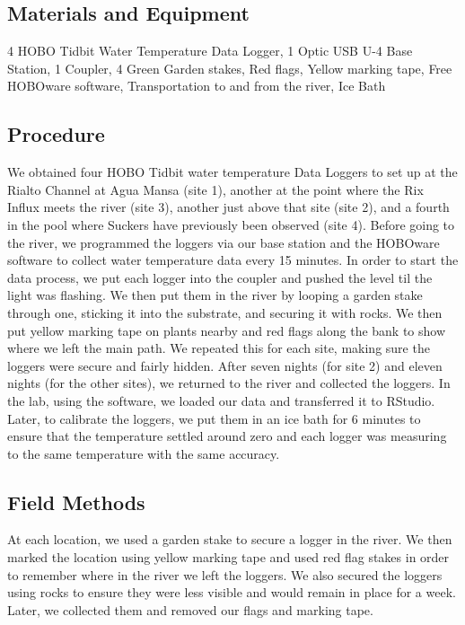 \documentclass{article}\usepackage[]{graphicx}\usepackage[]{color}
\begin{document}
\subsection{Materials and Equipment}

4 HOBO Tidbit Water Temperature Data Logger,
1 Optic USB U-4 Base Station,
1 Coupler,
4 Green Garden stakes,
Red flags,
Yellow marking tape,
Free HOBOware software,
Transportation to and from the river,
Ice Bath

\subsection{Procedure}

We obtained four HOBO Tidbit water temperature Data Loggers to set up at the Rialto Channel at Agua Mansa (site 1), another at the point where the Rix Influx meets the river (site 3), another just above that site (site 2), and a fourth in the pool where Suckers have previously been observed (site 4). Before going to the river, we programmed the loggers via our base station and the HOBOware software to collect water temperature data every 15 minutes. In order to start the data process, we put each logger into the coupler and pushed the level til the light was flashing. We then put them in the river by looping a garden stake through one, sticking it into the substrate, and securing it with rocks. We then put yellow marking tape on plants nearby and red flags along the bank to show where we left the main path. We repeated this for each site, making sure the loggers were secure and fairly hidden. After seven nights (for site 2) and eleven nights (for the other sites), we returned to the river and collected the loggers. In the lab, using the software, we loaded our data and transferred it to RStudio. Later, to calibrate the loggers, we put them in an ice bath for 6 minutes to ensure that the temperature settled around zero and each logger was measuring to the same temperature with the same accuracy.

\subsection{Field Methods} 

At each location, we used a garden stake to secure a logger in the river. We then marked the location using yellow marking tape and used red flag stakes in order to remember where in the river we left the loggers. We also secured the loggers using rocks to ensure they were less visible and would remain in place for a week. Later, we collected them and removed our flags and marking tape. 
\end{document}
